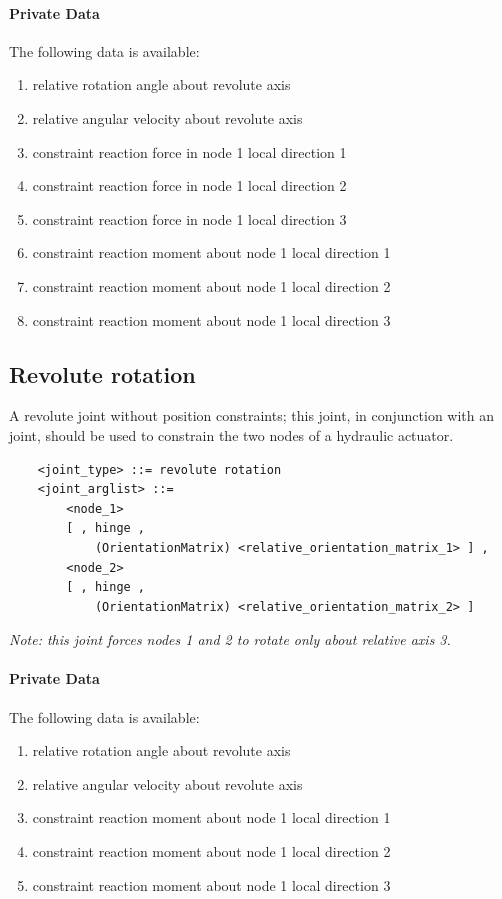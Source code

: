 \paragraph{Private Data}
The following data is available:
\begin{enumerate}
\item {} relative rotation angle about revolute axis
\item {} relative angular velocity about revolute axis
\item {} constraint reaction force in node 1 local direction 1
\item {} constraint reaction force in node 1 local direction 2
\item {} constraint reaction force in node 1 local direction 3
\item {} constraint reaction moment about node 1 local direction 1
\item {} constraint reaction moment about node 1 local direction 2
\item {} constraint reaction moment about node 1 local direction 3
\end{enumerate}






\subsection{Revolute rotation}
A revolute joint without position constraints; this joint, in conjunction
with an  joint, should be used to constrain the two nodes
of a hydraulic actuator.
\begin{verbatim}
    <joint_type> ::= revolute rotation
    <joint_arglist> ::= 
        <node_1>
        [ , hinge , 
            (OrientationMatrix) <relative_orientation_matrix_1> ] ,
        <node_2>
        [ , hinge , 
            (OrientationMatrix) <relative_orientation_matrix_2> ]
\end{verbatim}
{\em
    Note: this joint forces nodes 1 and 2 to rotate only about relative 
    axis 3.
}

\paragraph{Private Data}
The following data is available:
\begin{enumerate}
\item {} relative rotation angle about revolute axis
\item {} relative angular velocity about revolute axis
\item {} constraint reaction moment about node 1 local direction 1
\item {} constraint reaction moment about node 1 local direction 2
\item {} constraint reaction moment about node 1 local direction 3
\end{enumerate}





